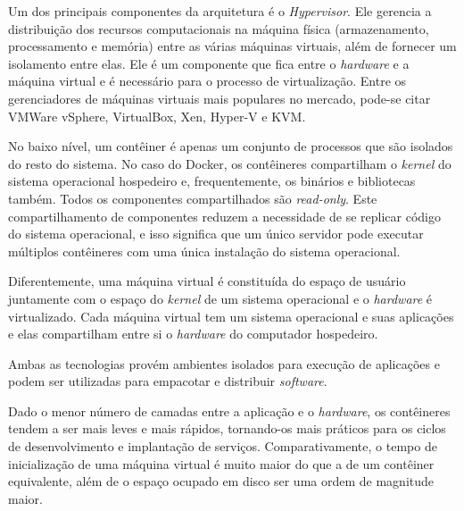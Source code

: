 	Um dos principais componentes da arquitetura é o \textit{Hypervisor}. Ele gerencia a distribuição dos recursos computacionais na máquina física (armazenamento, processamento e memória) entre as várias máquinas virtuais, além de fornecer um isolamento entre elas. Ele é um componente que fica entre o \textit{hardware} e a máquina virtual e é necessário para o processo de virtualização.
	Entre os gerenciadores de máquinas virtuais mais populares no mercado, pode-se citar VMWare vSphere, VirtualBox, Xen, Hyper-V e KVM.

	No baixo nível, um contêiner é apenas um conjunto de processos que são isolados do resto do sistema. No caso do Docker, os contêineres compartilham o \textit{kernel} do sistema operacional hospedeiro e, frequentemente, os binários e bibliotecas também. Todos os componentes compartilhados são \textit{read-only}. Este compartilhamento de componentes reduzem a necessidade de se replicar código do sistema operacional, e isso significa que um único servidor pode executar múltiplos contêineres com uma única instalação do sistema operacional.

	Diferentemente, uma máquina virtual é constituída do espaço de usuário juntamente com o espaço do \textit{kernel} de um sistema operacional e o \textit{hardware} é virtualizado. Cada máquina virtual tem um sistema operacional e suas aplicações e elas compartilham entre si o \textit{hardware} do computador hospedeiro.

	Ambas as tecnologias provém ambientes isolados para execução de aplicações e podem ser utilizadas para empacotar e distribuir \textit{software}.

	Dado o menor número de camadas entre a aplicação e o \textit{hardware},  os contêineres tendem a ser mais leves e mais rápidos, tornando-os mais práticos para os ciclos de desenvolvimento e implantação de serviços. Comparativamente, o tempo de inicialização de uma máquina virtual é muito maior do que a de um contêiner equivalente, além de o espaço ocupado em disco ser uma ordem de magnitude maior. \cite{whatsthediffvmvscontainers}
	
